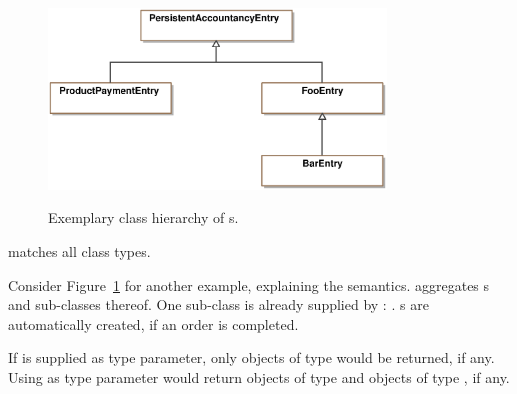 \begin{figure}
	\centering
  \includegraphics[width=0.8\textwidth]{images/type_matches.eps}
	\label{matches}
	\caption[Example for a type hierarchy.]{Exemplary class hierarchy of s.}
\end{figure}
 matches all class types.

Consider Figure~\ref{matches} for another example, explaining the  semantics.
 aggregates s and sub-classes thereof.
One sub-class is already supplied by \salespoint{}: .
s are automatically created, if an order is completed.

If  is supplied as type parameter, only objects of type  would be returned, if any.
Using  as type parameter would return objects of type  and objects of type , if any.
	

